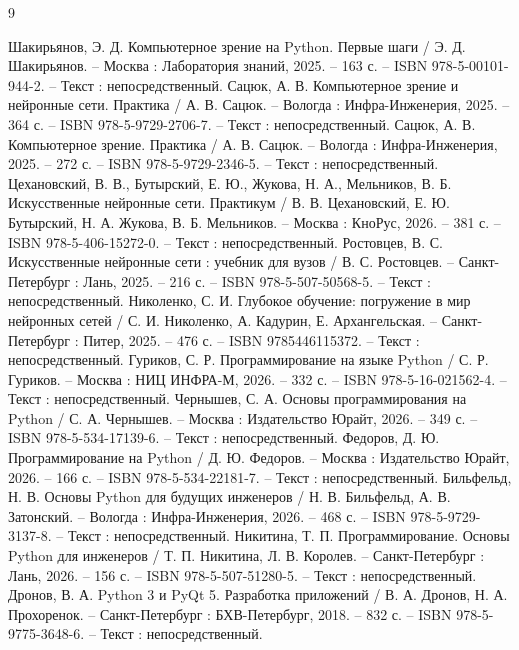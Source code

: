 
\begin{thebibliography}{9}
	
	 Шакирьянов, Э. Д. Компьютерное зрение на Python. Первые шаги / Э. Д. Шакирьянов. -- Москва : Лаборатория знаний, 2025. -- 163 с. -- ISBN 978-5-00101-944-2. -- Текст : непосредственный.
	 Сацюк, А. В. Компьютерное зрение и нейронные сети. Практика / А. В. Сацюк. -- Вологда : Инфра-Инженерия, 2025. -- 364 с. -- ISBN 978-5-9729-2706-7. -- Текст : непосредственный.
	 Сацюк, А. В. Компьютерное зрение. Практика / А. В. Сацюк. -- Вологда : Инфра-Инженерия, 2025. -- 272 с. -- ISBN 978-5-9729-2346-5. -- Текст : непосредственный.
	 Цехановский, В. В., Бутырский, Е. Ю., Жукова, Н. А., Мельников, В. Б. Искусственные нейронные сети. Практикум / В. В. Цехановский, Е. Ю. Бутырский, Н. А. Жукова, В. Б. Мельников. -- Москва : КноРус, 2026. -- 381 с. -- ISBN 978-5-406-15272-0. -- Текст : непосредственный.
	 Ростовцев, В. С. Искусственные нейронные сети : учебник для вузов / В. С. Ростовцев. -- Санкт-Петербург : Лань, 2025. -- 216 с. -- ISBN 978-5-507-50568-5. -- Текст : непосредственный. 
	 Николенко, С. И. Глубокое обучение: погружение в мир нейронных сетей / С. И. Николенко, А. Кадурин, Е. Архангельская. -- Санкт-Петербург : Питер, 2025. -- 476 с. -- ISBN 9785446115372. -- Текст : непосредственный.
	 Гуриков, С. Р. Программирование на языке Python / С. Р. Гуриков. -- Москва : НИЦ ИНФРА-М, 2026. -- 332 с. -- ISBN 978-5-16-021562-4. -- Текст : непосредственный.
	 Чернышев, С. А. Основы программирования на Python / С. А. Чернышев. -- Москва : Издательство Юрайт, 2026. -- 349 с. -- ISBN 978-5-534-17139-6. -- Текст : непосредственный.
	 Федоров, Д. Ю. Программирование на Python / Д. Ю. Федоров. -- Москва : Издательство Юрайт, 2026. -- 166 с. -- ISBN 978-5-534-22181-7. -- Текст : непосредственный.
	 Бильфельд, Н. В. Основы Python для будущих инженеров / Н. В. Бильфельд, А. В. Затонский. -- Вологда : Инфра-Инженерия, 2026. -- 468 с. -- ISBN 978-5-9729-3137-8. -- Текст : непосредственный.
	 Никитина, Т. П. Программирование. Основы Python для инженеров / Т. П. Никитина, Л. В. Королев. -- Санкт-Петербург : Лань, 2026. -- 156 с. -- ISBN 978-5-507-51280-5. -- Текст : непосредственный.
	 Дронов, В. А. Python 3 и PyQt 5. Разработка приложений / В. А. Дронов, Н. А. Прохоренок. -- Санкт-Петербург : БХВ-Петербург, 2018. -- 832 с. -- ISBN 978-5-9775-3648-6. -- Текст : непосредственный.

\end{thebibliography}
